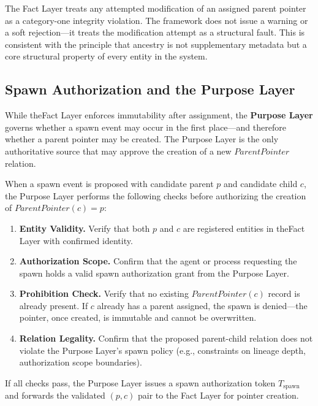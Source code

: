 The Fact Layer treats any attempted modification of an assigned parent pointer as a category-one integrity violation. The framework does not issue a warning or a soft rejection—it treats the modification attempt as a structural fault. This is consistent with the principle that ancestry is not supplementary metadata but a core structural property of every entity in the system.

\subsection{Spawn Authorization and the Purpose Layer}

While theFact Layer enforces immutability after assignment, the \textbf{Purpose Layer} governs whether a spawn event may occur in the first place—and therefore whether a parent pointer may be created. The Purpose Layer is the only authoritative source that may approve the creation of a new $ParentPointer$ relation.

\begin{protocol}
When a spawn event is proposed with candidate parent $p$ and candidate child $c$, the Purpose Layer performs the following checks before authorizing the creation of $ParentPointer(c) = p$:

\begin{enumerate}
    \item \textbf{Entity Validity.} Verify that both $p$ and $c$ are registered entities in theFact Layer with confirmed identity.
    \item \textbf{Authorization Scope.} Confirm that the agent or process requesting the spawn holds a valid spawn authorization grant from the Purpose Layer.
    \item \textbf{Prohibition Check.} Verify that no existing $ParentPointer(c)$ record is already present. If $c$ already has a parent assigned, the spawn is denied—the pointer, once created, is immutable and cannot be overwritten.
    \item \textbf{Relation Legality.} Confirm that the proposed parent-child relation does not violate the Purpose Layer's spawn policy (e.g., constraints on lineage depth, authorization scope boundaries).
\end{enumerate}

If all checks pass, the Purpose Layer issues a spawn authorization token $T_{\text{spawn}}$ and forwards the validated $(p, c)$ pair to the Fact Layer for pointer creation.
\end{protocol}

